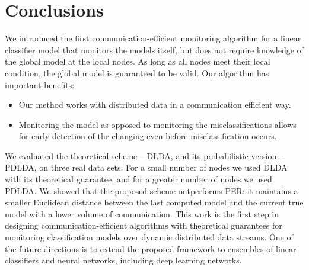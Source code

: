 \documentclass{vldb}
\begin{document}
\section*{Conclusions}
We introduced the first communication-efficient monitoring algorithm for a linear classifier model that monitors the
models itself, but does not require knowledge of the global model at the local nodes.
As long as all nodes meet their local condition, the
global model is guaranteed to be valid. Our algorithm has important benefits:
\begin{itemize}
  \item Our method works with distributed data in a communication efficient way.
  \item Monitoring the model as opposed to monitoring the misclassifications
  allows for early detection of the changing even before misclassification
  occurs.
\end{itemize}

We evaluated the theoretical scheme -- DLDA,  and its probabilistic version -- PDLDA, on three real data sets.
For a small number of nodes we used DLDA with its theoretical guarantee, and for a greater number of nodes we used
PDLDA. We showed that the proposed scheme outperforms PER: it maintains a smaller Euclidean distance between
the last computed model and the current true model with a lower volume of communication.
This work is the first step in designing communication-efficient algorithms
with theoretical guarantees for monitoring classification models over dynamic distributed data streams. One of the future directions is to extend the proposed framework to
ensembles of linear classifiers and neural networks, including deep learning networks.


\nocite{*}
\end{document}
